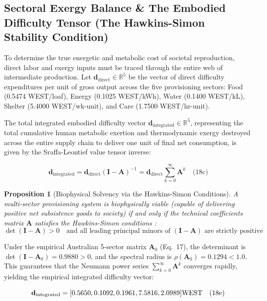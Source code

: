 \documentclass[preprint,12pt,authoryear]{elsarticle}
\newtheorem{proposition}{Proposition}
\theoremstyle{definition}
\begin{document}
\subsection{Sectoral Exergy Balance \& The Embodied Difficulty Tensor (The Hawkins-Simon Stability Condition)}

To determine the true energetic and metabolic cost of societal reproduction, direct labor and exergy inputs must be traced through the entire web of intermediate production. Let $\mathbf{d}_{\text{direct}} \in \mathbb{R}^5$ be the vector of direct difficulty expenditures per unit of gross output across the five provisioning sectors: Food (0.5474 WEST/loaf), Energy (0.1025 WEST/kWh), Water (0.1400 WEST/kL), Shelter (5.4000 WEST/wk-unit), and Care (1.7500 WEST/hr-unit).

The total integrated embodied difficulty vector $\mathbf{d}_{\text{integrated}} \in \mathbb{R}^5$, representing the total cumulative human metabolic exertion and thermodynamic exergy destroyed across the entire supply chain to deliver one unit of final net consumption, is given by the Sraffa-Leontief value tensor inverse:

$$\mathbf{d}_{\text{integrated}} = \mathbf{d}_{\text{direct}} (\mathbf{I} - \mathbf{A})^{-1} = \mathbf{d}_{\text{direct}} \sum_{k=0}^\infty \mathbf{A}^k \quad \text{(18c)}$$

\begin{proposition}[Biophysical Solvency via the Hawkins-Simon Conditions]
A multi-sector provisioning system is biophysically viable (capable of delivering positive net subsistence goods to society) if and only if the technical coefficients matrix $\mathbf{A}$ satisfies the Hawkins-Simon conditions \citep{hawkins1949}:
\begin{equation}
\det(\mathbf{I} - \mathbf{A}) > 0 \quad \text{and all leading principal minors of } (\mathbf{I} - \mathbf{A}) \text{ are strictly positive} \label{eq:hawkins_simon_statement}
\end{equation}
\end{proposition}



Under the empirical Australian 5-sector matrix $\mathbf{A}_0$ (Eq.~17), the determinant is $\det(\mathbf{I} - \mathbf{A}_0) = 0.9880 > 0$, and the spectral radius is $\rho(\mathbf{A}_0) = 0.1294 < 1.0$. This guarantees that the Neumann power series $\sum_{k=0}^\infty \mathbf{A}^k$ converges rapidly, yielding the empirical integrated difficulty vector:

$$\mathbf{d}_{\text{integrated}} = [0.5650, 0.1092, 0.1961, 7.5816, 2.0989] \\ \text{WEST} \quad \text{(18e)}$$
\end{document}
